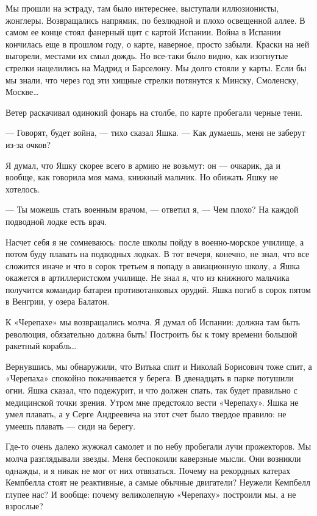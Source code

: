 Мы  прошли  на  эстраду,  там  было  интереснее,  выступали  иллюзионисты,
жонглеры. Возвращались напрямик, по безлюдной и плохо освещенной аллее.  В
самом ее  конце стоял  фанерный  щит с  картой  Испании. Война  в  Испании
кончилась еще в прошлом году, о карте, наверное, просто забыли. Краски  на
ней выгорели, местами их смыл дождь. Но все-таки было видно, как изогнутые
стрелки нацелились на Мадрид и Барселону. Мы долго стояли у карты. Если бы
мы знали, что через год эти хищные стрелки потянутся к Минску,  Смоленску,
Москве…

Ветер раскачивал  одинокий фонарь  на столбе,  по карте  пробегали  черные
тени.

— Говорят, будет война, — тихо сказал Яшка. — Как думаешь, меня не заберут
из-за очков?

Я думал, что  Яшку скорее всего  в армию не  возьмут: он —  очкарик, да  и
вообще, как  говорила  моя  мама,  книжный мальчик.  Но  обижать  Яшку  не
хотелось.

— Ты можешь  стать военным врачом,  — ответил  я, — Чем  плохо? На  каждой
подводной лодке есть врач.

Насчет себя я не сомневаюсь: после школы пойду в военно-морское училище, а
потом буду плавать на  подводных лодках. В тот  вечеря, конечно, не  знал,
что все сложится иначе и что в сорок третьем я попаду в авиационную школу,
а Яшка окажется  в артиллеристском  училище. Не  знал я,  что из  книжного
мальчика получится командир батареи  противотанковых орудий. Яшка погиб  в
сорок пятом в Венгрии, у озера Балатон.

К «Черепахе» мы возвращались  молча. Я думал об  Испании: должна там  быть
революция, обязательно должна  быть! Построить бы  к тому времени  большой
ракетный корабль…

Вернувшись, мы обнаружили, что Витька спит и Николай Борисович тоже  спит,
а «Черепаха» спокойно покачивается у берега. В двенадцать в парке потушили
огни. Яшка сказал, что подежурит, и что должен спать, так будет  правильно
с медицинской точки зрения. Утром мне предстояло вести «Черепаху». Яшка не
умел плавать, а у Серге Андреевича  на этот счет было твердое правило:  не
умеешь плавать — сиди на берегу.

Где-то очень далеко жужжал самолет  и по небу пробегали лучи  прожекторов.
Мы  молча  разглядывали  звезды.  Меня  беспокоили  каверзные  мысли.  Они
возникли однажды, и я никак не мог от них отвязаться. Почему на  рекордных
катерах Кемпбелла стоят не реактивные, а самые обычные двигатели?  Неужели
Кемпбелл глупее нас?  И вообще: почему  великолепную «Черепаху»  построили
мы, а не взрослые?

